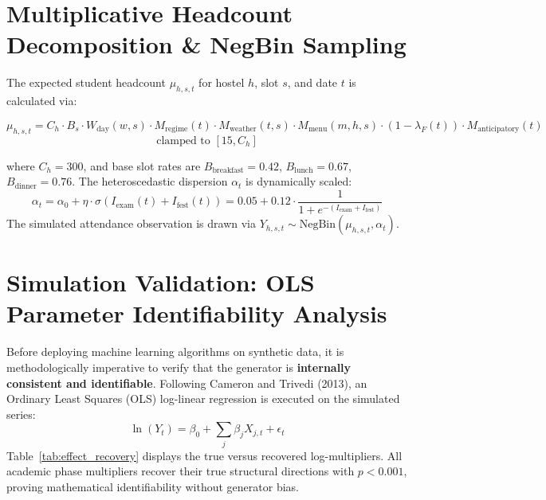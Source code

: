 \documentclass[11pt,a4paper,oneside]{report}
\begin{document}
\section{Multiplicative Headcount Decomposition \& NegBin Sampling}
The expected student headcount $\mu_{h,s,t}$ for hostel $h$, slot $s$, and date $t$ is calculated via:
\begin{mathformulationbox}
$$\mu_{h,s,t} = C_h \cdot B_s \cdot W_{\text{day}}(w, s) \cdot M_{\text{regime}}(t) \cdot M_{\text{weather}}(t, s) \cdot M_{\text{menu}}(m, h, s) \cdot (1 - \lambda_F(t)) \cdot M_{\text{anticipatory}}(t)$$
$$\text{clamped to } [15, C_h]$$
\end{mathformulationbox}
where $C_h = 300$, and base slot rates are $B_{\text{breakfast}} = 0.42$, $B_{\text{lunch}} = 0.67$, $B_{\text{dinner}} = 0.76$. The heteroscedastic dispersion $\alpha_t$ is dynamically scaled:
\begin{equation}
\alpha_t = \alpha_0 + \eta \cdot \sigma(I_{\text{exam}}(t) + I_{\text{fest}}(t)) = 0.05 + 0.12 \cdot \frac{1}{1 + e^{-(I_{\text{exam}} + I_{\text{fest}})}}
\end{equation}
The simulated attendance observation is drawn via $Y_{h,s,t} \sim \text{NegBin}(\mu_{h,s,t}, \alpha_t)$.

\section{Simulation Validation: OLS Parameter Identifiability Analysis}
Before deploying machine learning algorithms on synthetic data, it is methodologically imperative to verify that the generator is \textbf{internally consistent and identifiable}. Following Cameron and Trivedi (2013), an Ordinary Least Squares (OLS) log-linear regression is executed on the simulated series:
\begin{equation}
\ln(Y_t) = \beta_0 + \sum_j \beta_j X_{j,t} + \epsilon_t
\end{equation}
Table~\ref{tab:effect_recovery} displays the true versus recovered log-multipliers. All academic phase multipliers recover their true structural directions with $p < 0.001$, proving mathematical identifiability without generator bias.
\end{document}
